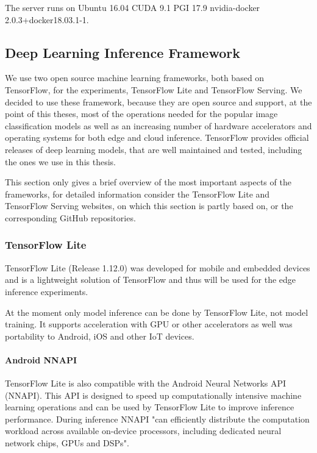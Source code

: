 The server runs on Ubuntu 16.04 CUDA 9.1 PGI 17.9 nvidia-docker 2.0.3+docker18.03.1-1.
\subsection{Deep Learning Inference Framework}
We use two open source machine learning frameworks, both based on TensorFlow, for the experiments, TensorFlow Lite and TensorFlow Serving. We decided to use these framework, because they are open source and support, at the point of this theses, most of the operations needed for the popular image classification models as well as an increasing number of hardware accelerators and operating systems for both edge and cloud inference.
TensorFlow provides official releases of deep learning models, that are well maintained and tested, including the ones we use in this thesis.

This section only gives a brief overview of the most important aspects of the frameworks, for detailed information consider the TensorFlow Lite\cite{tfLite}  and TensorFlow Serving\cite{tfServing} websites, on which this section is partly based on, or the corresponding GitHub repositories.
\subsubsection{TensorFlow Lite}
\label{chap:TFLite}
TensorFlow Lite (Release 1.12.0) was developed for mobile and embedded devices and is a lightweight solution of TensorFlow and thus will be used for the edge inference experiments.

At the moment only model inference can be done by TensorFlow Lite, not model training.
It supports acceleration with GPU or other accelerators as well was portability to Android, iOS and other IoT devices.

\paragraph{Android NNAPI}
\label{chap:NNAPI}
TensorFlow Lite is also compatible with the Android Neural Networks API (NNAPI). This API
is designed to speed up computationally intensive machine learning operations and can be used by TensorFlow Lite to improve inference performance. During inference NNAPI "can
efficiently distribute the computation workload across available on-device processors, including dedicated neural network chips, GPUs and DSPs"\cite{DBLP:journals/corr/abs-1810-01109}.

